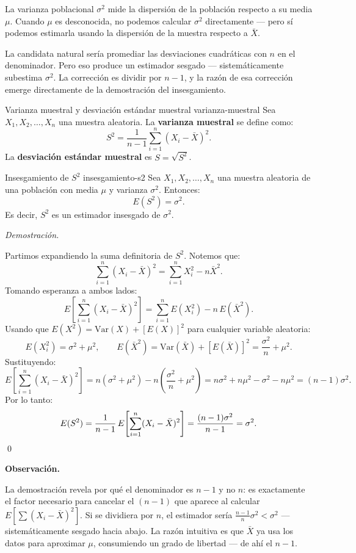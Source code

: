 \documentclass[12pt, a4paper]{book}
\newenvironment{observacion}{%
    \par\medskip\noindent\textbf{\color{azul}Observaci\'{o}n.}\enspace\itshape
}{\par\medskip}
\renewenvironment{proof}{%
    \par\medskip\noindent\textit{Demostraci\'{o}n.}\enspace
}{\qed\par\medskip}
\numberwithin{equation}{chapter}
\begin{document}
La varianza poblacional $\sigma^2$ mide la
dispersi\'{o}n de la poblaci\'{o}n respecto a
su media $\mu$. Cuando $\mu$ es desconocida,
no podemos calcular $\sigma^2$ directamente
--- pero s\'{i} podemos estimarla usando la
dispersi\'{o}n de la muestra respecto a
$\bar{X}$.

La candidata natural ser\'{i}a promediar las
desviaciones cuadr\'{a}ticas con $n$ en el
denominador. Pero eso produce un estimador
sesgado --- sistem\'{a}ticamente subestima
$\sigma^2$. La correcci\'{o}n es dividir por
$n-1$, y la raz\'{o}n de esa correcci\'{o}n
emerge directamente de la demostraci\'{o}n
del insesgamiento.

\begin{definicion}{Varianza muestral y
		desviaci\'{o}n est\'{a}ndar muestral}
	{varianza-muestral}
	Sea $X_1, X_2, \ldots, X_n$ una muestra
	aleatoria. La \textbf{varianza muestral}
	se define como:
	\[
	S^2 = \frac{1}{n-1}
	\sum_{i=1}^{n}(X_i - \bar{X})^2.
	\]
	La \textbf{desviaci\'{o}n est\'{a}ndar
		muestral} es $S = \sqrt{S^2}$.
\end{definicion}

\begin{proposicion}{Insesgamiento de $S^2$}
	{insesgamiento-s2}
	Sea $X_1, X_2, \ldots, X_n$ una muestra
	aleatoria de una poblaci\'{o}n con media
	$\mu$ y varianza $\sigma^2$. Entonces:
	\[
	E(S^2) = \sigma^2.
	\]
	Es decir, $S^2$ es un estimador insesgado
	de $\sigma^2$.
\end{proposicion}

\begin{proof}
	Partimos expandiendo la suma definitoria
	de $S^2$. Notemos que:
	\[
	\sum_{i=1}^{n}(X_i - \bar{X})^2
	= \sum_{i=1}^{n} X_i^2
	- n\bar{X}^2.
	\]
	Tomando esperanza a ambos lados:
	\[
	E\!\left[\sum_{i=1}^{n}
	(X_i - \bar{X})^2\right]
	= \sum_{i=1}^{n} E(X_i^2)
	- n\,E(\bar{X}^2).
	\]
	Usando que $E(X^2) = \text{Var}(X) +
	[E(X)]^2$ para cualquier variable
	aleatoria:
	\[
	E(X_i^2) = \sigma^2 + \mu^2,
	\qquad
	E(\bar{X}^2) = \text{Var}(\bar{X})
	+ [E(\bar{X})]^2
	= \frac{\sigma^2}{n} + \mu^2.
	\]
	Sustituyendo:
	\[
	E\!\left[\sum_{i=1}^{n}
	(X_i - \bar{X})^2\right]
	= n(\sigma^2 + \mu^2)
	- n\!\left(\frac{\sigma^2}{n}
	+ \mu^2\right)
	= n\sigma^2 + n\mu^2
	- \sigma^2 - n\mu^2
	= (n-1)\sigma^2.
	\]
	Por lo tanto:
	\[
	E(S^2) = \frac{1}{n-1}\,
	E\!\left[\sum_{i=1}^{n}
	(X_i - \bar{X})^2\right]
	= \frac{(n-1)\sigma^2}{n-1}
	= \sigma^2. \qedhere
	\]
\end{proof}

\begin{observacion}
	La demostraci\'{o}n revela por qu\'{e}
	el denominador es $n-1$ y no $n$: es
	exactamente el factor necesario para
	cancelar el $(n-1)$ que aparece al
	calcular $E\!\left[\sum(X_i -
	\bar{X})^2\right]$. Si se dividiera
	por $n$, el estimador ser\'{i}a
	$\frac{n-1}{n}\sigma^2 < \sigma^2$
	--- sistem\'{a}ticamente sesgado
	hacia abajo. La raz\'{o}n intuitiva
	es que $\bar{X}$ ya usa los datos
	para aproximar $\mu$, consumiendo
	un grado de libertad --- de ah\'{i}
	el $n-1$.
\end{observacion}
\end{document}

